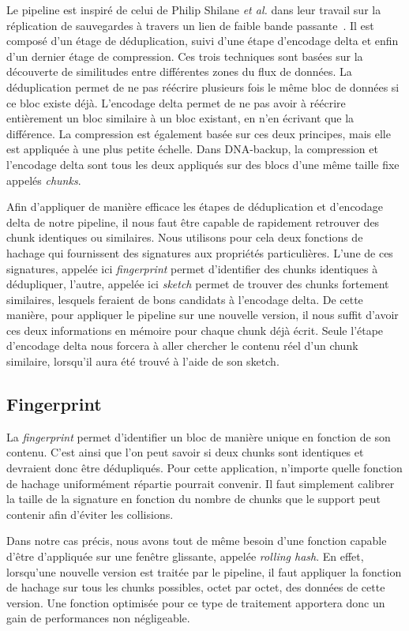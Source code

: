 \documentclass[a4paper]{report}
\makeatletter
\newcommand{\etal}{\emph{et al.}\@\xspace}
\makeatother
\begin{document}
Le pipeline est inspiré de celui de Philip Shilane \etal
dans leur travail sur la réplication de sauvegardes à travers un lien de faible bande passante~\cite{shilane2012wan}.
Il est composé d'un étage de déduplication, suivi d'une étape d'encodage delta et enfin d'un dernier étage de compression.
Ces trois techniques sont basées sur la découverte de similitudes entre différentes zones du flux de données.
La déduplication permet de ne pas réécrire plusieurs fois le même bloc de données si ce bloc existe déjà.
L'encodage delta permet de ne pas avoir à réécrire entièrement un bloc similaire à un bloc existant, en n'en écrivant que la différence.
La compression est également basée sur ces deux principes, mais elle est appliquée à une plus petite échelle.
Dans DNA-backup, la compression et l'encodage delta sont tous les deux appliqués sur des blocs d'une même taille fixe appelés \emph{chunks}.

Afin d'appliquer de manière efficace les étapes de déduplication et d'encodage delta de notre pipeline,
il nous faut être capable de rapidement retrouver des chunk identiques ou similaires.
Nous utilisons pour cela deux fonctions de hachage qui fournissent des signatures aux propriétés particulières.
L'une de ces signatures, appelée ici \emph{fingerprint} permet d'identifier des chunks identiques à dédupliquer,
l'autre, appelée ici \emph{sketch} permet de trouver des chunks fortement similaires,
lesquels feraient de bons candidats à l'encodage delta.
De cette manière, pour appliquer le pipeline sur une nouvelle version,
il nous suffit d'avoir ces deux informations en mémoire pour chaque chunk déjà écrit.
Seule l'étape d'encodage delta nous forcera à aller chercher le contenu réel d'un chunk similaire,
lorsqu'il aura été trouvé à l'aide de son sketch.

\subsection{Fingerprint}

La \emph{fingerprint} permet d'identifier un bloc de manière unique en fonction de son contenu.
C'est ainsi que l'on peut savoir si deux chunks sont identiques et devraient donc être dédupliqués.
Pour cette application, n'importe quelle fonction de hachage uniformément répartie pourrait convenir.
Il faut simplement calibrer la taille de la signature en fonction du nombre de chunks que le support peut contenir afin d'éviter les collisions.

Dans notre cas précis, nous avons tout de même besoin d'une fonction capable d'être d'appliquée sur une fenêtre glissante, appelée \emph{rolling hash}.
En effet, lorsqu'une nouvelle version est traitée par le pipeline,
il faut appliquer la fonction de hachage sur tous les chunks possibles, octet par octet, des données de cette version.
Une fonction optimisée pour ce type de traitement apportera donc un gain de performances non négligeable.
\end{document}
